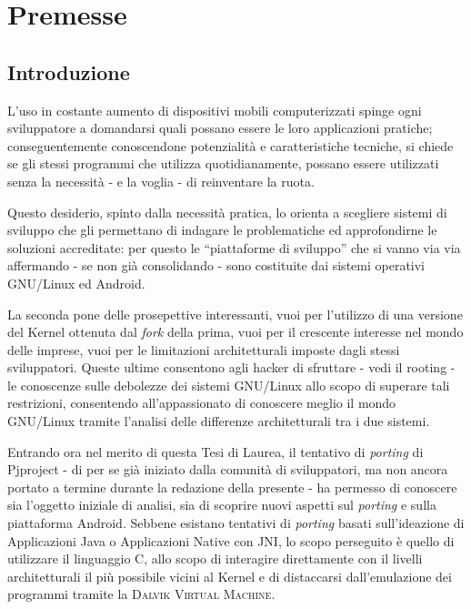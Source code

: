 
\chapter{Premesse}
\minitoc\mtcskip

\section{Introduzione}
L'uso in costante aumento di dispositivi mobili computerizzati spinge ogni sviluppatore a domandarsi
quali possano essere le loro applicazioni pratiche; conseguentemente
conoscendone  potenzialità e caratteristiche tecniche, si
chiede se gli stessi programmi che utilizza quotidianamente, possano essere
utilizzati senza la necessità - e la voglia - di reinventare la ruota.

Questo desiderio, spinto dalla necessità pratica, lo orienta a scegliere
sistemi di sviluppo che gli permettano di indagare le problematiche ed approfondirne
le soluzioni accreditate: per questo le ``piattaforme di sviluppo'' che si vanno via via
affermando - se non già consolidando - sono costituite dai sistemi operativi
GNU/Linux ed Android.

La seconda pone delle prosepettive interessanti, vuoi per l'utilizzo di una versione
del Kernel ottenuta dal \textit{fork} della prima, vuoi per il crescente interesse nel
mondo delle imprese, vuoi per le limitazioni architetturali imposte dagli stessi
sviluppatori. Queste ultime consentono agli hacker di sfruttare - vedi il rooting - 
le conoscenze sulle debolezze dei sistemi GNU/Linux allo scopo di superare
tali restrizioni, consentendo all'appassionato di conoscere meglio
il mondo GNU/Linux tramite l'analisi delle differenze architetturali
tra i due sistemi.
\bigskip

Entrando ora nel merito di questa Tesi di Laurea, il tentativo di \textit{porting}
di Pjproject - di per se già iniziato dalla comunità di sviluppatori, ma non
ancora portato a termine durante la redazione della presente - ha permesso di conoscere
sia l'oggetto iniziale di analisi, sia di scoprire nuovi aspetti sul \textit{porting}
e sulla piattaforma Android. Sebbene esistano tentativi di \textit{porting} basati 
sull'ideazione di Applicazioni Java o Applicazioni Native con JNI, lo scopo
perseguito è quello di utilizzare  il linguaggio 
C, allo scopo di interagire direttamente con il livelli architetturali il più
possibile vicini al Kernel e di distaccarsi dall'emulazione dei programmi tramite
la \textsc{Dalvik Virtual Machine}.

